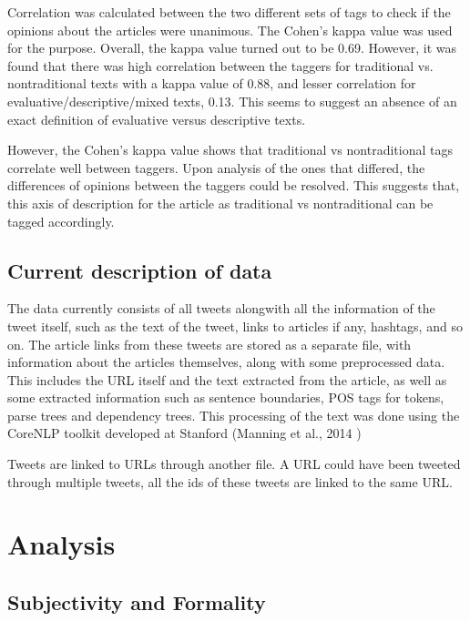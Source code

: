 \documentclass[11pt]{article}
\begin{document}
Correlation was calculated between the two different sets of tags to check if the opinions about the articles were unanimous. The Cohen’s kappa value was used for the purpose. Overall, the kappa value turned out to be 0.69. However, it was found that there was high correlation between the taggers for traditional vs. nontraditional texts with a kappa value of 0.88, and lesser correlation for evaluative/descriptive/mixed texts, 0.13. This seems to suggest an absence of an exact definition of evaluative versus descriptive texts. 

However, the Cohen’s kappa value shows that traditional vs nontraditional tags correlate well between taggers. Upon analysis of the ones that differed, the differences of opinions between the taggers could be resolved. This suggests that, this axis of description for the article as traditional vs nontraditional can be tagged accordingly.

\subsection {Current description of data}

The data currently consists of all tweets alongwith all the information of the tweet itself, such as the text of the tweet, links to articles if any, hashtags, and so on. The article links from these tweets are stored as a separate file, with information about the articles themselves, along with some preprocessed data. This includes the URL itself and the text extracted from the article, as well as some extracted information such as sentence boundaries, POS tags for tokens, parse trees and dependency trees. This processing of the text was done using the CoreNLP toolkit developed at Stanford (Manning et al., 2014 \cite{manning2014stanford})

Tweets are linked to URLs through another file. A URL could have been tweeted through multiple tweets, all the ids of these tweets are linked to the same URL. 


\section{Analysis}
\subsection{Subjectivity and Formality }
\end{document}
